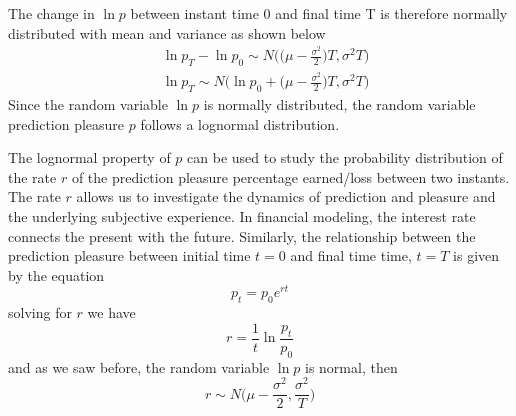 \documentclass[11pt, onecolumn]{article}
\begin{document}
The change in $\ln p $ between instant time 0 and final time T is therefore normally distributed with mean and variance as shown below
\begin{equation*}
\begin{split}
 & \ln p_T - \ln p_0 \sim N \bigg( \big(\mu - \frac{\sigma ^2}{2} \big) T, \sigma^2 T \bigg) \\
 & \ln p_T  \sim N \bigg( \ln p_0 + \big(\mu - \frac{\sigma ^2}{2} \big) T, \sigma^2 T \bigg) 
\end{split}
\label{eq:slns3}
\end{equation*}
Since the random variable $\ln p$ is normally distributed, the random variable  prediction pleasure $p$ follows a lognormal distribution. 
%
%

The lognormal property of $p$ can be used to study the
probability distribution of the rate $r$ of the prediction pleasure percentage earned/loss between two instants. The rate $r$ allows us to investigate the dynamics of prediction and pleasure and the underlying subjective experience. 
In financial modeling, the interest rate connects the present with the future. Similarly, the relationship between the prediction pleasure between initial time $t = 0$ and final time time, $t=T$ is given by the equation
\begin{equation*}
   p_t = p_0 e^{r t}
\label{eq:vpbpt}
\end{equation*}
solving for $r$ we have
\begin{equation*}
   r = \frac{1}{t}\ln \frac{p_t}{p_0}
\label{eq:vpbpt2}
\end{equation*}
and as we saw before, the random variable $\ln p$ is normal, then   
\begin{equation}
   r \sim  N \bigg( \mu - \frac{\sigma ^2}{2} , \frac{\sigma^2}{T} \bigg) 
\label{eq:vpbpt3}
\end{equation}

\end{document}
